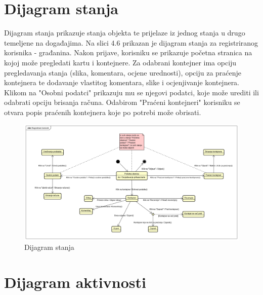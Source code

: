 %			
			
			
			
			\eject
		
		\section{Dijagram stanja}
			
			
			Dijagram stanja prikazuje stanja objekta te prijelaze iz jednog stanja u drugo temeljene na događajima. Na slici 4.6 prikazan je dijagram stanja za registriranog korisnika - građanina. Nakon prijave, korisniku se prikazuje početna stranica na kojoj može pregledati kartu i kontejnere. Za odabrani kontejner ima opciju pregledavanja stanja (slika, komentara, ocjene urednosti), opciju za praćenje kontejnera te dodavanje vlastitog komentara, slike i ocjenjivanje kontejnera. Klikom na "Osobni podatci" prikazuju mu se njegovi podatci, koje može urediti ili odabrati opciju brisanja računa. Odabirom "Praćeni kontejneri" korisniku se otvara popis praćenih kontejnera koje po potrebi može obrisati.
			
			\begin{figure}[H]
				\includegraphics[width=1.0\linewidth]{slike/dijagramStanja.png}
				\centering
				\caption{Dijagram stanja}
				\label{fig:dijagramStanja}
			\end{figure}
			
			
			\eject 
		
		\section{Dijagram aktivnosti}
			
